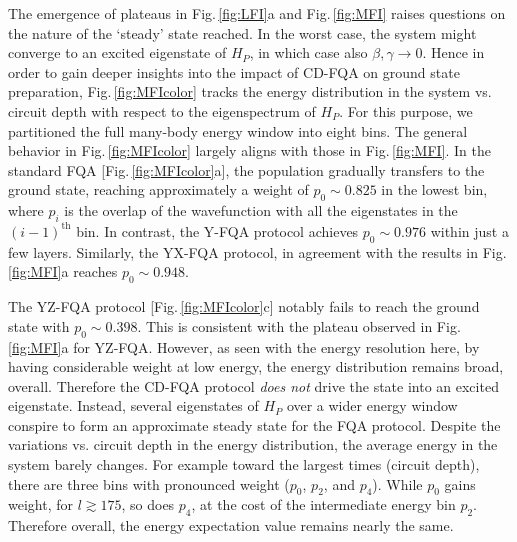 \documentclass[twocolumn,aps,superscriptaddress,floatfix,longbibliography]{revtex4-2}
\newcommand{\awx}[1]{{\color[rgb]{.8,.6,.6}{\sout{#1}}}}
\newcommand{\hir}[1]{{\color[rgb]{0.4,0.1,0.6}{#1}}}
\newcommand{\Fig}[1]{Fig.\,\ref{fig:#1}}
\begin{document}
The emergence of plateaus in \Fig{LFI}a and
\Fig{MFI} raises questions on the nature of the `steady'
state reached. In the worst case, the system might converge to an
excited eigenstate of $H_P$, in which case also
$\beta,\gamma \to 0$. Hence in order
to gain deeper insights into the impact of CD-FQA on ground
state preparation, \Fig{MFIcolor} 
tracks the energy distribution in the system
vs. circuit depth with respect to the eigenspectrum of $H_P$.
For this purpose, we partitioned %
the full many-body energy window %
into eight bins. The general behavior %
in \Fig{MFIcolor} largely aligns with those in \Fig{MFI}.
In the standard FQA [\Fig{MFIcolor}a], the
population gradually transfers to the ground state, reaching
approximately a weight of $p_0 \sim 0.825$ in the lowest bin, where $p_i$ is the overlap of the wavefunction with all the eigenstates in the $(i-1)^{\text{th}}$ bin. 
In contrast, the Y-FQA protocol achieves %
$p_0 \sim 0.976$ within just a few layers.
%
Similarly, %
the YX-FQA protocol, in agreement with the results in
\Fig{MFI}a reaches %
$p_0 \sim 0.948$.

The YZ-FQA protocol [\Fig{MFIcolor}c]
notably fails to reach the
ground state with %
$p_0 \sim 0.398$.
This is consistent with the plateau observed in \Fig{MFI}a
for YZ-FQA. However, as seen with the energy resolution here,
by having considerable weight at low
energy, the energy distribution remains broad, overall.
Therefore the CD-FQA protocol {\it does not} drive
the state into an excited eigenstate. Instead, several
eigenstates of $H_P$ over a wider energy window conspire
to form an approximate steady state for the FQA protocol.
Despite the variations vs. circuit depth in the
energy distribution, the average energy in the system
barely changes. For example toward the largest times
(circuit depth), there are three bins
with pronounced weight ($p_0$, $p_2$, and $p_4$).
While $p_0$ gains weight, for $l\gtrsim 175$,
so does $p_4$, at the cost of the intermediate 
energy bin $p_2$. Therefore overall, the energy
expectation value remains nearly the same.

 
%
\end{document}
